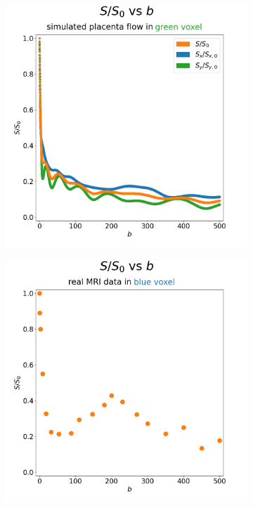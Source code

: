 \begin{figure}
\begin{centering}
\begin{subfigure}{0.45\textwidth}
\begin{centering}
                        \includegraphics[width=\textwidth]{diagrams/results-mri/simulated-placenta/mri-spins_sall-vs-b_2D_placenta_1_491.png}
                        \caption{}
                        \label{fig:mri-placenta-comparison-2:green-s-vs-b}
                    \end{centering}
                \end{subfigure}
                \begin{subfigure}{0.45\textwidth}
                    \begin{centering}
                        \includegraphics[width=\textwidth]{diagrams/results-mri/simulated-placenta/mri-spins_s-vs-b_real_mri_0_190,140.png}

\end{centering}
\end{subfigure}
\end{centering}
\end{figure}
